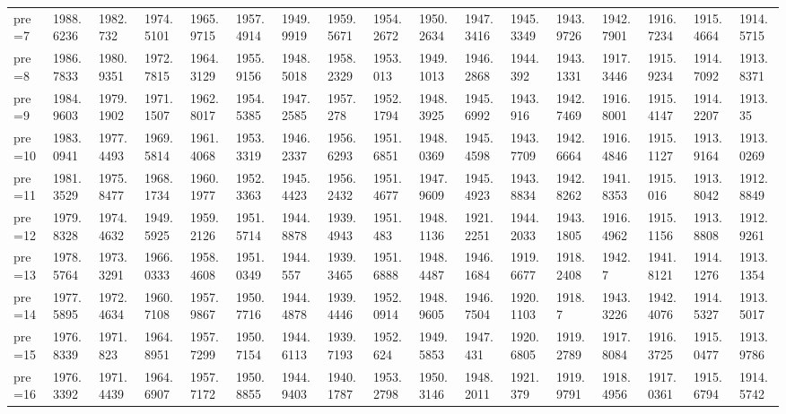 \documentclass[11pt]{article}
\begin{document}
\begin{tabular}{lllllllllllllllll}
	 pre=7       & 1988.6236   & 1982.732    & 1974.5101   & 1965.9715   & 1957.4914   & 1949.9919   & 1959.5671   & 1954.2672   & 1950.2634   & 1947.3416   & 1945.3349   & 1943.9726   & 1942.7901   & 1916.7234   & 1915.4664   & 1914.5715  \\
	 pre=8       & 1986.7833   & 1980.9351   & 1972.7815   & 1964.3129   & 1955.9156   & 1948.5018   & 1958.2329   & 1953.013    & 1949.1013   & 1946.2868   & 1944.392    & 1943.1331   & 1917.3446   & 1915.9234   & 1914.7092   & 1913.8371  \\
	 pre=9       & 1984.9603   & 1979.1902   & 1971.1507   & 1962.8017   & 1954.5385   & 1947.2585   & 1957.278    & 1952.1794   & 1948.3925   & 1945.6992   & 1943.916    & 1942.7469   & 1916.8001   & 1915.4147   & 1914.2207   & 1913.35    \\
	 pre=10      & 1983.0941   & 1977.4493   & 1969.5814   & 1961.4068   & 1953.3319   & 1946.2337   & 1956.6293   & 1951.6851   & 1948.0369   & 1945.4598   & 1943.7709   & 1942.6664   & 1916.4846   & 1915.1127   & 1913.9164   & 1913.0269  \\
	 pre=11      & 1981.3529   & 1975.8477   & 1968.1734   & 1960.1977   & 1952.3363   & 1945.4423   & 1956.2432   & 1951.4677   & 1947.9609   & 1945.4923   & 1943.8834   & 1942.8262   & 1941.8353   & 1915.016    & 1913.8042   & 1912.8849  \\
	 pre=12      & 1979.8328   & 1974.4632   & 1949.5925   & 1959.2126   & 1951.5714   & 1944.8878   & 1939.4943   & 1951.483    & 1948.1136   & 1921.2251   & 1944.2033   & 1943.1805   & 1916.4962   & 1915.1156   & 1913.8808   & 1912.9261  \\
	 pre=13      & 1978.5764   & 1973.3291   & 1966.0333   & 1958.4608   & 1951.0349   & 1944.557    & 1939.3465   & 1951.6888   & 1948.4487   & 1946.1684   & 1919.6677   & 1918.2408   & 1942.7      & 1941.8121   & 1914.1276   & 1913.1354  \\
	 pre=14      & 1977.5895   & 1972.4634   & 1960.7108   & 1957.9867   & 1950.7716   & 1944.4878   & 1939.4446   & 1952.0914   & 1948.9605   & 1946.7504   & 1920.1103   & 1918.7      & 1943.3226   & 1942.4076   & 1914.5327   & 1913.5017  \\
	 pre=15      & 1976.8339   & 1971.823    & 1964.8951   & 1957.7299   & 1950.7154   & 1944.6113   & 1939.7193   & 1952.624    & 1949.5853   & 1947.431    & 1920.6805   & 1919.2789   & 1917.8084   & 1916.3725   & 1915.0477   & 1913.9786  \\
	 pre=16      & 1976.3392   & 1971.4439   & 1964.6907   & 1957.7172   & 1950.8855   & 1944.9403   & 1940.1787   & 1953.2798   & 1950.3146   & 1948.2011   & 1921.379    & 1919.9791   & 1918.4956   & 1917.0361   & 1915.6794   & 1914.5742  \\

\end{tabular}
\end{document}
